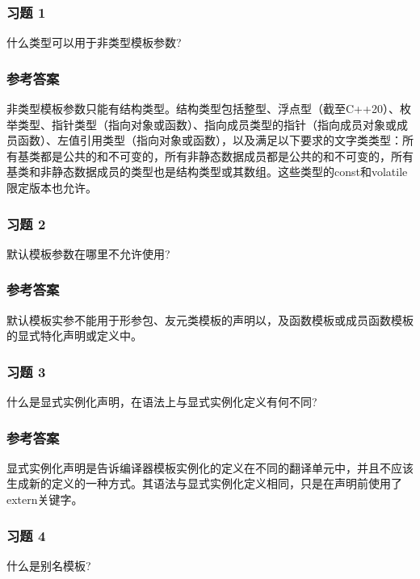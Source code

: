 \subsubsection{习题 1}

什么类型可以用于非类型模板参数?

\subsubsection{参考答案}

非类型模板参数只能有结构类型。结构类型包括整型、浮点型（截至C++20）、枚举类型、指针类型（指向对象或函数）、指向成员类型的指针（指向成员对象或成员函数）、左值引用类型（指向对象或函数），以及满足以下要求的文字类类型：所有基类都是公共的和不可变的，所有非静态数据成员都是公共的和不可变的，所有基类和非静态数据成员的类型也是结构类型或其数组。这些类型的const和volatile限定版本也允许。


\subsubsection{习题 2}

默认模板参数在哪里不允许使用?

\subsubsection{参考答案}

默认模板实参不能用于形参包、友元类模板的声明以，及函数模板或成员函数模板的显式特化声明或定义中。

\subsubsection{习题 3}

什么是显式实例化声明，在语法上与显式实例化定义有何不同?

\subsubsection{参考答案}

显式实例化声明是告诉编译器模板实例化的定义在不同的翻译单元中，并且不应该生成新的定义的一种方式。其语法与显式实例化定义相同，只是在声明前使用了extern关键字。

\subsubsection{习题 4}

什么是别名模板?

